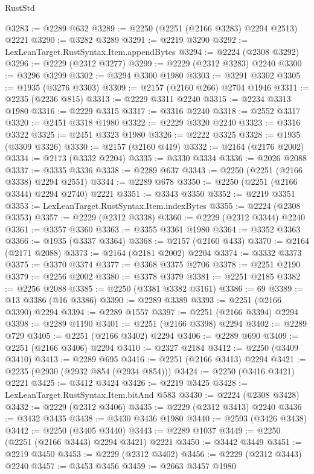 \begin{lexlean}{RustStd}
\begin{coremodule}
{\begin{coremodule}
{{{{{{{{{{{{{{{{{{{{{{{{{{{{{{{{{{{{{{{{{{{{{{{{{{{{{@3283 := @2289 @632
@3289 := @2250 (@2251 (@2166 @3283) @2294 @2513) @2221
@3290 := @3282 @3289
@3291 := @2219 @3290
@3292 := LexLeanTarget.RustSyntax.Item.appendBytes
@3294 := @2224 (@2308 @3292)
@3296 := @2229 (@2312 @3277)
@3299 := @2229 (@2312 @3283) @2240
@3300 := @3296 @3299
@3302 := @3294 @3300 @1980
@3303 := @3291 @3302
@3305 := @1935 (@3276 @3303)
@3309 := @2157 (@2160 @266) @2704 @1946
@3311 := @2235 (@2236 @815)
@3313 := @2229 @3311 @2240
@3315 := @2234 @3313 @1980
@3316 := @2229 @3315
@3317 := @3316 @2240
@3318 := @2552 @3317
@3320 := @2451 @3318 @1980
@3322 := @2229 @3320 @2240
@3323 := @3316 @3322
@3325 := @2451 @3323 @1980
@3326 := @2222 @3325
@3328 := @1935 (@3309 @3326)
@3330 := @2157 (@2160 @419)
@3332 := @2164 (@2176 @2002)
@3334 := @2173 (@3332 @2204)
@3335 := @3330 @3334
@3336 := @2026 @2088
@3337 := @3335 @3336
@3338 := @2289 @637
@3343 := @2250 (@2251 (@2166 @3338) @2294 @2551)
@3344 := @2289 @678
@3350 := @2250 (@2251 (@2166 @3344) @2294 @2740) @2221
@3351 := @3343 @3350
@3352 := @2219 @3351
@3353 := LexLeanTarget.RustSyntax.Item.indexBytes
@3355 := @2224 (@2308 @3353)
@3357 := @2229 (@2312 @3338)
@3360 := @2229 (@2312 @3344) @2240
@3361 := @3357 @3360
@3363 := @3355 @3361 @1980
@3364 := @3352 @3363
@3366 := @1935 (@3337 @3364)
@3368 := @2157 (@2160 @433)
@3370 := @2164 (@2171 @2088)
@3373 := @2164 (@2181 @2002) @2204
@3374 := @3332 @3373
@3375 := @3370 @3374
@3377 := @3368 @3375 @2706
@3378 := @2251 @2190
@3379 := @2256 @2002
@3380 := @3378 @3379
@3381 := @2251 @2185
@3382 := @2256 @2088
@3385 := @2250 (@3381 @3382 @3161)
@3386 := 69
@3389 := @13 @3386 (@16 @3386)
@3390 := @2289 @3389
@3393 := @2251 (@2166 @3390) @2294
@3394 := @2289 @1557
@3397 := @2251 (@2166 @3394) @2294
@3398 := @2289 @1190
@3401 := @2251 (@2166 @3398) @2294
@3402 := @2289 @729
@3405 := @2251 (@2166 @3402) @2294
@3406 := @2289 @690
@3409 := @2251 (@2166 @3406) @2294
@3410 := @2327 @2184
@3412 := @2250 (@3409 @3410)
@3413 := @2289 @695
@3416 := @2251 (@2166 @3413) @2294
@3421 := @2235 (@2930 (@2932 @854 (@2934 @854)))
@3424 := @2250 (@3416 @3421) @2221
@3425 := @3412 @3424
@3426 := @2219 @3425
@3428 := LexLeanTarget.RustSyntax.Item.bitAnd @583
@3430 := @2224 (@2308 @3428)
@3432 := @2229 (@2312 @3406)
@3435 := @2229 (@2312 @3413) @2240
@3436 := @3432 @3435
@3438 := @3430 @3436 @1980
@3440 := @2593 (@3426 @3438)
@3442 := @2250 (@3405 @3440)
@3443 := @2289 @1037
@3449 := @2250 (@2251 (@2166 @3443) @2294 @3421) @2221
@3450 := @3442 @3449
@3451 := @2219 @3450
@3453 := @2229 (@2312 @3402)
@3456 := @2229 (@2312 @3443) @2240
@3457 := @3453 @3456
@3459 := @2663 @3457 @1980
}}}}}}}}}}}}}}}}}}}}}}}}}}}}}}}}}}}}}}}}}}}}}}}}}}}}}
\end{coremodule}}
\end{coremodule}
\end{lexlean}
